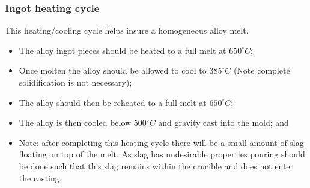 \subsubsection{Ingot heating cycle}

This heating/cooling cycle helps insure a homogeneous alloy melt.
\begin{itemize}
\item The \MgZnCa alloy ingot pieces should be heated to a full melt at $650^{\circ}C$;
\item Once molten the alloy should be allowed to cool to $385^{\circ}C$ (Note complete solidification is not necessary);
\item The alloy should then be reheated to a full melt at $650^{\circ}C$;
\item The alloy is then cooled below $500^{\circ}C$ and gravity cast into the mold; and
\item Note: after completing this heating cycle there will be a small amount of slag floating on top of the melt. As slag has undesirable properties pouring should be done such that this slag remains within the crucible and does not enter the casting.
\end{itemize}